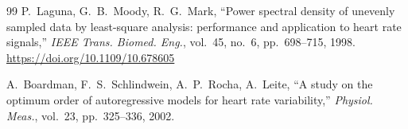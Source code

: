 \documentclass[11pt,a4paper]{article}
\begin{document}
\begin{thebibliography}{99}
 P.~Laguna, G.~B.~Moody, R.~G.~Mark, ``Power spectral density of unevenly sampled data by least-square analysis: performance and application to heart rate signals,'' \textit{IEEE Trans. Biomed. Eng.}, vol.~45, no.~6, pp.~698--715, 1998. \url{https://doi.org/10.1109/10.678605}

 A.~Boardman, F.~S.~Schlindwein, A.~P.~Rocha, A.~Leite, ``A study on the optimum order of autoregressive models for heart rate variability,'' \textit{Physiol. Meas.}, vol.~23, pp.~325--336, 2002.

\end{thebibliography}
\end{document}
